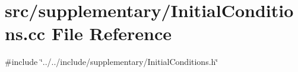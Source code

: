 \section{src/supplementary/\+Initial\+Conditions.cc File Reference}
\label{_initial_conditions_8cc}
{\ttfamily \#include \char`\"{}../../include/supplementary/\+Initial\+Conditions.\+h\char`\"{}}\newline
